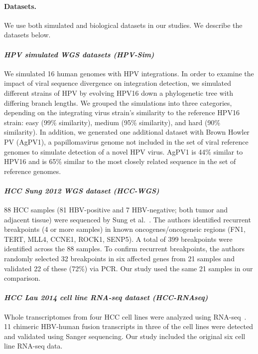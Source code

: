 \documentclass[10pt]{article}
\begin{document}
\paragraph{\textbf{Datasets.}}  We use both simulated and biological datasets in our studies.  We describe the datasets below.

\paragraph{\emph{HPV simulated WGS datasets (HPV-Sim)}}
We simulated 16 human genomes with HPV integrations.  In order to examine the impact of viral sequence divergence on integration detection, we simulated different strains of HPV by evolving HPV16 down a phylogenetic tree with differing branch lengths.  We grouped the simulations into three categories, depending on the integrating virus strain's similarity to the reference HPV16 strain: easy (99\% similarity), medium (95\% similarity), and hard (90\% similarity).  In addition, we generated one additional dataset with Brown Howler PV (AgPV1), a papillomavirus genome not included in the set of viral reference genomes to simulate detection of a novel HPV virus.  AgPV1 is 44\% similar to HPV16 and is 65\% similar to the most closely related sequence in the set of reference genomes.


\paragraph{\emph{HCC Sung 2012 WGS dataset (HCC-WGS)}}
88 HCC samples (81 HBV-positive and 7 HBV-negative; both tumor and adjacent tissue) were sequenced by Sung et al.~\cite{Sung2012}.  The authors identified recurrent breakpoints (4 or more samples) in known oncogenes/oncogeneic regions (FN1, TERT, MLL4, CCNE1, ROCK1, SENP5).  A total of 399 breakpoints were identified across the 88 samples.  To confirm recurrent breakpoints, the authors randomly selected 32 breakpoints in six affected genes from 21 samples and validated 22 of these (72\%) via PCR.  Our study used the same 21 samples in our comparison.

\paragraph{\emph{HCC Lau 2014 cell line RNA-seq dataset (HCC-RNAseq)}}
Whole transcriptomes from four HCC cell lines were analyzed using RNA-seq~\cite{Lau2014}.  11 chimeric HBV-human fusion transcripts in three of the cell lines were detected and validated using Sanger sequencing.  Our study included the original six cell line RNA-seq data.  
\end{document}
